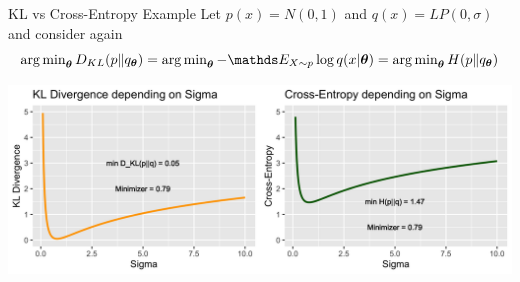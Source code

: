 \documentclass[11pt,compress,t,notes=noshow, xcolor=table]{beamer}
\begin{document}
\begin{vbframe}{KL vs Cross-Entropy Example}
Let $p(x)=N(0,1)$ and $q(x)=LP(0,\sigma)$ and consider again
$$ \argmin_{\thetab} D_{KL}(p \| q_{\thetab}) = \argmin_{\thetab} -\E_{X \sim p} \log q(x|\thetab) = \argmin_{\thetab} H(p \| q_{\thetab}) $$

\begin{center}
	\includegraphics[width=1\textwidth]{figure/kl_ce_comparison.png}
\end{center}

\end{vbframe}
\end{document}
